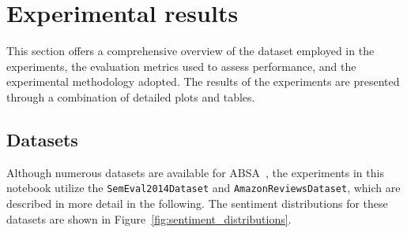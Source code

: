 
\section{Experimental results}\label{sec3}

This section offers a comprehensive overview of the dataset employed in the experiments, the evaluation metrics used to assess performance, and the experimental methodology adopted. The results of the experiments are presented through a combination of detailed plots and tables.

\subsection{Datasets}\label{sec:datasets}

Although numerous datasets are available for ABSA~\cite{ABSA_datasets}, the experiments in this notebook utilize the \texttt{SemEval2014Dataset} and \texttt{AmazonReviewsDataset}, which are described in more detail in the following. The sentiment distributions for these datasets are shown in Figure~\ref{fig:sentiment_distributions}.

